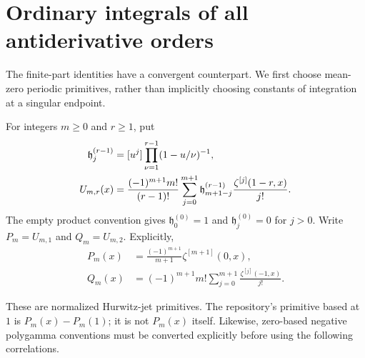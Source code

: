 \section{Ordinary integrals of all antiderivative orders}\label{shj:primitives}
The finite-part identities have a convergent counterpart. We first choose mean-zero periodic primitives, rather than implicitly choosing constants of integration at a singular endpoint.

\begin{definition}\label{shj:Udef}
For integers $m\ge0$ and $r\ge1$, put
\begin{align}
\mathfrak h_j^{(r-1)}&=[u^j]\prod_{\nu=1}^{r-1}(1-u/\nu)^{-1},\notag\\
U_{m,r}(x)&=\frac{(-1)^{m+1}m!}{(r-1)!}
\sum_{j=0}^{m+1}\mathfrak h_{m+1-j}^{(r-1)}
\frac{\zeta^{[j]}(1-r,x)}{j!}.
\label{shj:Uformula}
\end{align}
The empty product convention gives $\mathfrak h_0^{(0)}=1$ and $\mathfrak h_j^{(0)}=0$ for $j>0$. Write $P_m=U_{m,1}$ and $Q_m=U_{m,2}$. Explicitly,
\begin{align}
P_m(x)&=\frac{(-1)^{m+1}}{m+1}\zeta^{[m+1]}(0,x),\label{shj:P}\\
Q_m(x)&=(-1)^{m+1}m!\sum_{j=0}^{m+1}\frac{\zeta^{[j]}(-1,x)}{j!}.
\label{shj:Q}
\end{align}
\end{definition}
These are normalized Hurwitz-jet primitives. The repository's primitive based at $1$ is $P_m(x)-P_m(1)$; it is not $P_m(x)$ itself. Likewise, zero-based negative polygamma conventions must be converted explicitly before using the following correlations.


